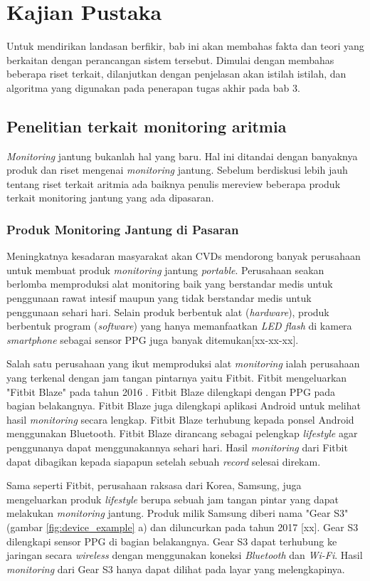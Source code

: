 \chapter{Kajian Pustaka}
Untuk mendirikan landasan berfikir, bab ini akan membahas fakta dan teori yang berkaitan dengan perancangan sistem tersebut. Dimulai dengan membahas beberapa riset terkait, dilanjutkan dengan penjelasan akan istilah istilah, dan algoritma yang digunakan pada penerapan tugas akhir pada bab 3.

\section{Penelitian terkait monitoring aritmia}
\textit{Monitoring} jantung bukanlah hal yang baru. Hal ini ditandai dengan banyaknya produk dan riset mengenai \textit{monitoring} jantung. Sebelum berdiskusi lebih jauh tentang riset terkait aritmia ada baiknya penulis mereview beberapa produk terkait monitoring jantung yang ada dipasaran.

\subsection{Produk Monitoring Jantung di Pasaran}
Meningkatnya kesadaran masyarakat akan CVDs mendorong banyak perusahaan untuk membuat produk \textit{monitoring} jantung \textit{portable}. Perusahaan seakan berlomba memproduksi alat monitoring baik yang berstandar medis untuk penggunaan rawat intesif maupun yang tidak berstandar medis untuk penggunaan sehari hari. Selain produk berbentuk alat (\textit{hardware}), produk berbentuk program (\textit{software}) yang hanya memanfaatkan \textit{LED flash} di kamera \textit{smartphone} sebagai sensor PPG juga banyak ditemukan[xx-xx-xx].

Salah satu perusahaan yang ikut memproduksi alat \textit{monitoring} ialah perusahaan yang terkenal dengan jam tangan pintarnya yaitu Fitbit. Fitbit mengeluarkan "Fitbit Blaze" pada tahun 2016 \cite{online:fitbit}. Fitbit Blaze dilengkapi dengan PPG pada bagian belakangnya. Fitbit Blaze juga dilengkapi aplikasi Android untuk melihat hasil \textit{monitoring} secara lengkap. Fitbit Blaze terhubung kepada ponsel Android menggunakan Bluetooth. Fitbit Blaze dirancang sebagai pelengkap \textit{lifestyle} agar penggunanya dapat menggunakannya sehari hari. Hasil \textit{monitoring} dari Fitbit dapat dibagikan kepada siapapun setelah sebuah \textit{record} selesai direkam.

Sama seperti Fitbit, perusahaan raksasa dari Korea, Samsung, juga mengeluarkan produk \textit{lifestyle} berupa sebuah jam tangan pintar yang dapat melakukan \textit{monitoring} jantung. Produk milik Samsung diberi nama "Gear S3" (gambar \ref{fig:device_example} a) dan diluncurkan pada tahun 2017 [xx]. Gear S3 dilengkapi sensor PPG di bagian belakangnya. Gear S3 dapat terhubung ke jaringan secara \textit{wireless} dengan menggunakan koneksi \textit{Bluetooth} dan \textit{Wi-Fi}. Hasil \textit{monitoring} dari Gear S3 hanya dapat dilihat pada layar yang melengkapinya.

